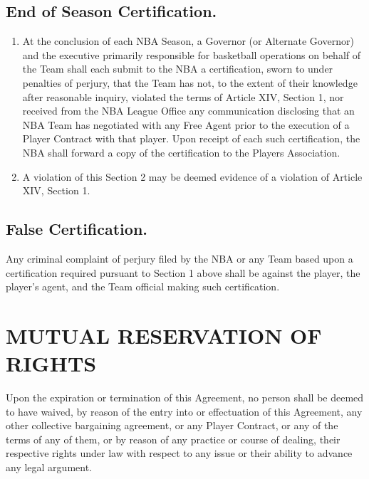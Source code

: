 \documentclass[
]{book}
\providecommand{\tightlist}{%
  \setlength{\itemsep}{0pt}\setlength{\parskip}{0pt}}
\begin{document}
\hypertarget{end-of-season-certification.}{%
\section{End of Season Certification.}\label{end-of-season-certification.}}

\begin{enumerate}
\def\labelenumi{(\alph{enumi})}
\tightlist
\item
  At the conclusion of each NBA Season, a Governor (or Alternate Governor) and the executive primarily responsible for basketball operations on behalf of the Team shall each submit to the NBA a certification, sworn to under penalties of perjury, that the Team has not, to the extent of their knowledge after reasonable inquiry, violated the terms of Article XIV, Section 1, nor received from the NBA League Office any communication disclosing that an NBA Team has negotiated with any Free Agent prior to the execution of a Player Contract with that player. Upon receipt of each such certification, the NBA shall forward a copy of the certification to the Players Association.
\item
  A violation of this Section 2 may be deemed evidence of a violation of Article XIV, Section 1.
\end{enumerate}

\hypertarget{false-certification.}{%
\section{False Certification.}\label{false-certification.}}

Any criminal complaint of perjury filed by the NBA or any Team based upon a certification required pursuant to Section 1 above shall be against the player, the player's agent, and the Team official making such certification.

\hypertarget{mutual-reservation-of-rights}{%
\chapter{MUTUAL RESERVATION OF RIGHTS}\label{mutual-reservation-of-rights}}

Upon the expiration or termination of this Agreement, no person shall be deemed to have waived, by reason of the entry into or effectuation of this Agreement, any other collective bargaining agreement, or any Player Contract, or any of the terms of any of them, or by reason of any practice or course of dealing, their respective rights under law with respect to any issue or their ability to advance any legal argument.
\end{document}
